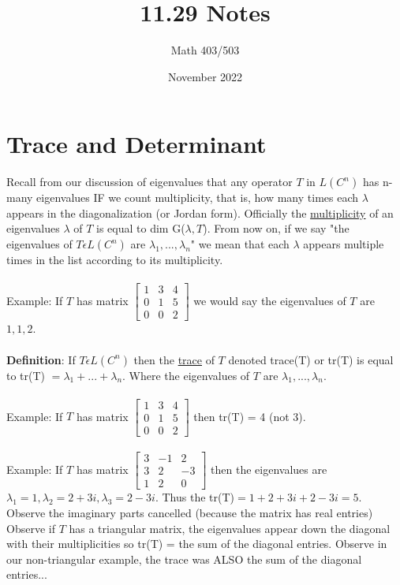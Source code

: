 \documentclass{article}
\title{11.29 Notes}
\author{Math 403/503}
\date{November 2022}
\begin{document}
\maketitle

\section{Trace and Determinant}
Recall from our discussion of eigenvalues that any operator $T$ in $L(C^n)$ has n-many eigenvalues IF we count multiplicity, that is, how many times each $\lambda$ appears in the diagonalization (or Jordan form). Officially the \underline{multiplicity} of an eigenvalues $\lambda$ of $T$ is equal to dim G($\lambda, T$). From now on, if we say "the eigenvalues of $T \epsilon L(C^n)$ are $\lambda_1, ..., \lambda_n$" we mean that each $\lambda$ appears multiple times in the list according to its multiplicity. \\\\
Example: If $T$ has matrix $\begin{bmatrix} 
1&3&4\\0&1&5\\0&0&2
\end{bmatrix}$ we would say the eigenvalues of $T$ are $1, 1, 2$. \\\\
\textbf{Definition}: If $T \epsilon L(C^n)$ then the \underline{trace} of $T$ denoted trace(T) or tr(T) is equal to tr(T) $= \lambda_1 + ... + \lambda_n.$ Where the eigenvalues of $T$ are $\lambda_1, ..., \lambda_n$. \\\\
Example: If $T$ has matrix $\begin{bmatrix} 
1&3&4\\0&1&5\\0&0&2
\end{bmatrix}$ then tr(T) = 4 (not 3). \\\\
Example: If $T$ has matrix $\begin{bmatrix}
3&-1&2\\3&2&-3\\1&2&0
\end{bmatrix}$ then the eigenvalues are $\lambda_1 = 1, \lambda_2 = 2 + 3i, \lambda_3 = 2 - 3i$. Thus the tr(T)$ = 1+2+3i + 2 - 3i = 5$. Observe the imaginary parts cancelled (because the matrix has real entries) Observe if $T$ has a triangular matrix, the eigenvalues appear down the diagonal with their multiplicities so tr(T) = the sum of the diagonal entries. Observe in our non-triangular example, the trace was ALSO the sum of the diagonal entries...\\\\
\end{document}
